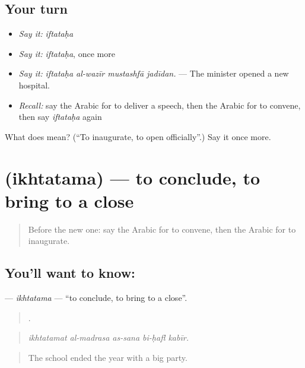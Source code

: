 \subsection*{Your turn}
\begin{itemize}
\raggedright
  \item \emph{Say it:} \emph{iftataḥa}
  \item \emph{Say it:} \emph{iftataḥa}, once more
  \item \emph{Say it:} \emph{iftataḥa al-wazīr mustashfā jadīdan.} — The minister opened a new hospital.
  \item \emph{Recall:} say the Arabic for to deliver a speech, then the Arabic for to convene, then say \emph{iftataḥa} again
\end{itemize}

\begin{tcolorbox}[breakable,colback=teal!4,colframe=teal!35!black,title={Before you move on}]
What does  mean? (\textquotedblleft{}To inaugurate, to open officially\textquotedblright{}.) Say it once more.
\end{tcolorbox}
\section[\texorpdfstring{\ar{اختتم} (ikhtatama)}{اختتم (ikhtatama)}]{ (ikhtatama) — to conclude, to bring to a close}

\label{lesson:AR-C357-ikhtatama}



\begin{quote}
Before the new one: say the Arabic for to convene, then the Arabic for to inaugurate.
\end{quote}

\subsection*{You'll want to know: }
\textbf{} — \emph{ikhtatama} — \textquotedblleft{}to conclude, to bring to a close\textquotedblright{}.

\begin{quote}
    .
\end{quote}

\begin{quote}
\emph{ikhtatamat al-madrasa as-sana bi-ḥafl kabīr.}
\end{quote}

\begin{quote}
The school ended the year with a big party.
\end{quote}

